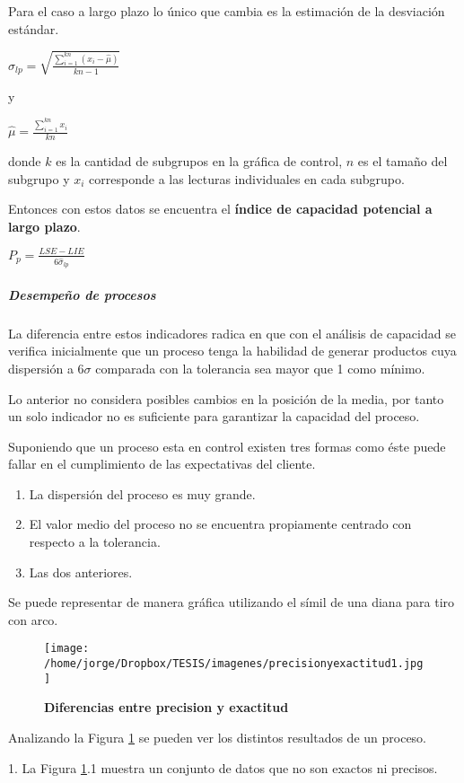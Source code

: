 \documentclass[spanish]{report}
\begin{document}
Para el caso a largo plazo lo único que cambia es la estimación de
la desviación estándar.

$\hat{\sigma}_{lp}= \sqrt{\frac{\sum_{i=1}^{kn}(x_{i}-\hat{\mu})}{kn-1}}$

y

$\hat{\mu}=\frac{\sum_{i=1}^{kn}x_{i}}{kn}$

donde $k$ es la cantidad de subgrupos en la gráfica de control, $n$
es el tamaño del subgrupo y $x_{i}$ corresponde a las lecturas individuales
en cada subgrupo. 

Entonces con estos datos se encuentra el \textbf{índice de capacidad potencial
a largo plazo}.


${P}_{p}=\frac{LSE-LIE}{6\hat{\sigma}_{lp}}$


\subparagraph{Desempeño de procesos}

La diferencia entre estos indicadores radica en que con el análisis
de capacidad se verifica inicialmente que un proceso tenga la habilidad
de generar productos cuya dispersión a $6\sigma$ comparada con la
tolerancia sea mayor que 1 como mínimo.

Lo anterior no considera posibles cambios en la posición de la media, por tanto un solo indicador no es suficiente para garantizar la capacidad del proceso.

Suponiendo que un proceso esta en control existen tres formas como éste puede fallar en el cumplimiento de las expectativas del cliente.

\begin{enumerate}
\item La dispersión del proceso es muy grande.
\item El valor medio del proceso no se encuentra propiamente centrado con
respecto a la tolerancia.
\item Las dos anteriores.
\end{enumerate}

Se puede representar de manera gráfica utilizando el símil de una diana para tiro con arco.

\begin{figure}[H]
\centering
\texttt{[image: /home/jorge/Dropbox/TESIS/imagenes/precisionyexactitud1.jpg]}
\caption{\textbf{Diferencias entre precision y exactitud}}
\label{c2f1}
\end{figure}

Analizando la Figura \ref{c2f1} se pueden ver los distintos resultados de un proceso.

1. La Figura \ref{c2f1}.1 muestra un conjunto de datos que no son exactos ni precisos.
\end{document}
